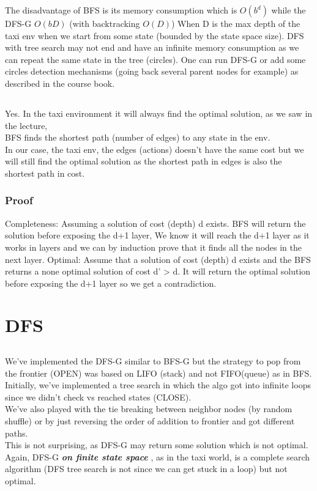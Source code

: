 \documentclass[12pt]{article}
\begin{document}
The disadvantage of BFS is its memory consumption which is $O(b^d)$ while the DFS-G $O(bD)$ (with backtracking $O(D)$) When D is the max depth of the taxi env when we start from some state (bounded by the state space size). DFS with tree search may not end and have an infinite memory consumption as we can repeat the same state in the tree (circles). One can run DFS-G or add some circles detection mechanisms (going back several parent nodes for example) as described in the course book.

\subsection{}
Yes. In the taxi environment it will always find the optimal solution, as we saw in the lecture,\\

BFS finds the shortest path (number of edges) to any state in the env.\\
In our case, the taxi env, the edges (actions) doesn't have the same cost but we will still find the optimal solution as the shortest path in edges is also the shortest path in cost.
\subsubsection*{Proof}
Completeness: Assuming a solution of cost (depth) d exists. BFS will return the solution before exposing the d+1 layer, We know it will reach the d+1 layer as it works in layers and we can by induction prove that it finds all the nodes in the next layer.
Optimal: Assume that a solution of cost (depth) d exists and the BFS returns a none optimal solution of cost d’ > d. It will return the optimal solution before exposing the d+1 layer so we get a contradiction.

\section{DFS}

\subsection{}
We've implemented the DFS-G similar to BFS-G but the strategy to pop from the frontier (OPEN) was based on LIFO (stack) and not FIFO(queue) as in BFS.\\
Initially, we've implemented a tree search in which the algo got into infinite loops since we didn't check vs reached states (CLOSE).\\
We've also played with the tie breaking between neighbor nodes (by random shuffle) or by just reversing the order of addition to frontier and got different paths.\\
This is not surprising, as DFS-G may return some solution which is not optimal.
Again, DFS-G \textbf{\emph{on finite state space}} , as in the taxi world, is a complete search algorithm (DFS tree search is not since we can get stuck in a loop) but not optimal. 
\end{document}

